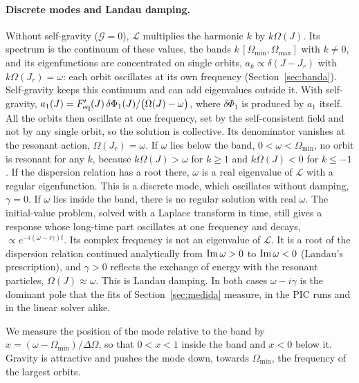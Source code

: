 \documentclass[11pt,a4paper]{article}
\begin{document}
\paragraph{Discrete modes and Landau damping.} Without self-gravity ($\mathcal G=0$),
$\mathcal L$ multiplies the harmonic $k$ by $k\Omega(J)$. Its spectrum is the continuum of these
values, the bands $k\,[\Omega_{\min},\Omega_{\max}]$ with $k\ne0$, and its eigenfunctions are
concentrated on single orbits, $a_k\propto\delta(J-J_r)$ with $k\Omega(J_r)=\omega$: each orbit
oscillates at its own frequency (Section~\ref{sec:banda}). Self-gravity keeps this
continuum and can add eigenvalues outside it. With self-gravity,
$a_1(J)=F_{\rm eq}'(J)\,\delta\Phi_1(J)/\big(\Omega(J)-\omega\big)$, where $\delta\Phi_1$ is produced by
$a_1$ itself. All the orbits then oscillate at one frequency, set by the self-consistent
field and not by any single orbit, so the solution is collective. Its denominator vanishes
at the resonant action, $\Omega(J_r)=\omega$. If $\omega$ lies below the band,
$0<\omega<\Omega_{\min}$, no orbit is resonant for any $k$, because $k\Omega(J)>\omega$ for $k\ge1$
and $k\Omega(J)<0$ for $k\le-1$. If the dispersion relation has a root there, $\omega$ is a
real eigenvalue of $\mathcal L$ with a regular eigenfunction. This is a discrete mode, which
oscillates without damping, $\gamma=0$. If
$\omega$ lies inside the band, there is no regular solution with real $\omega$. The
initial-value problem, solved with a Laplace transform in time, still gives a response
whose long-time part oscillates at one frequency and decays, $\propto e^{-i(\omega-i\gamma)t}$. Its
complex frequency is not an eigenvalue of $\mathcal L$. It is a root of the dispersion
relation continued analytically from
${\rm Im}\,\omega>0$ to ${\rm Im}\,\omega<0$ (Landau's prescription), and $\gamma>0$ reflects the
exchange of energy with the resonant particles, $\Omega(J)\approx\omega$. This is Landau
damping. In both cases $\omega-i\gamma$ is the dominant pole that the fits of
Section~\ref{sec:medida} measure, in the PIC runs and in the linear solver alike.

We measure the position
of the mode relative to the band by $x=(\omega-\Omega_{\min})/\Delta\Omega$, so that
$0<x<1$ inside the band and $x<0$ below it. Gravity is attractive and pushes the mode
down, towards $\Omega_{\min}$, the frequency of the largest orbits.
\end{document}
